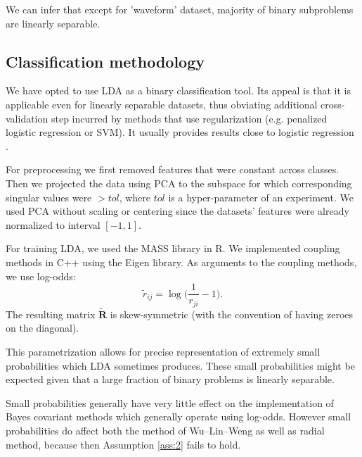 

We can infer that except for 'waveform' dataset, majority of binary subproblems 
are linearly separable.

\subsection{Classification methodology}

We have opted to use LDA as a binary classification tool. Its appeal is that it 
is applicable even for linearly separable datasets, thus obviating additional 
cross-validation step incurred by methods that use regularization 
(e.g. penalized logistic regression or SVM). It usually provides results close 
to logistic regression \cite{james2013introduction}.

For preprocessing we first removed features that were constant across classes. 
Then we projected the data using PCA to the subspace for which corresponding 
singular values were $> tol$, where $tol$ is a hyper-parameter of an experiment. 
We used PCA without scaling or centering since the datasets' features were 
already normalized to interval $[-1,1]$. 

For training LDA, we used the MASS library in R. We implemented coupling methods in C++ using the Eigen library. As arguments to the coupling methods, we use log-odds:
$$
\tilde r_{ij} = \log \biggl(\frac{1}{r_{ji}} - 1\biggr).
$$
The resulting matrix $\tilde{\boldsymbol{R}}$ is skew-symmetric (with the convention of having zeroes on the diagonal).

This parametrization allows for precise representation of extremely small 
probabilities which LDA sometimes produces. These small probabilities 
might be expected given that a large fraction of binary problems is linearly separable. 

Small probabilities generally have very little effect on the implementation of Bayes covariant methods which generally operate using log-odds. However small probabilities do affect both the method of Wu--Lin--Weng as well as radial method, because then Assumption \ref{ass:2} fails to hold. 



